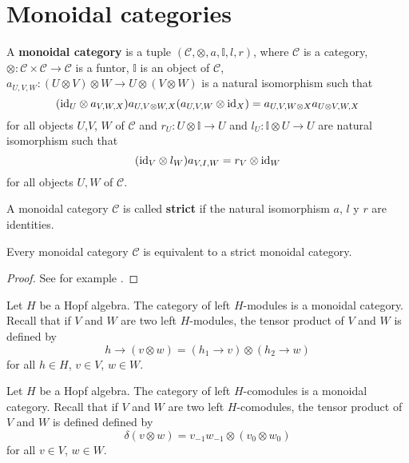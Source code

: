 \section{Monoidal categories}

\begin{definition}
A \textbf{monoidal category} is a tuple
$(\mathcal{C},\otimes,a,\mathbb{I},l,r)$, where $\mathcal{C}$ is a category,
$\otimes:\mathcal{C}\times\mathcal{C}\to\mathcal{C}$ is a funtor, $\mathbb{I}$
is an object of $\mathcal{C}$, $a_{U,V,W}:(U\otimes V)\otimes W\to
U\otimes(V\otimes W)$ is a natural isomorphism such that 
\begin{equation}
(\id_{U}\otimes a_{V,W,X})a_{U,V\otimes W,X}(a_{U,V,W}\otimes\id_{X})=a_{U,V,W\otimes X}a_{U\otimes V,W,X}\label{eq:pentagon}
\end{equation}
for all objects $U$,$V$, $W$ of $\mathcal{C}$ and $r_{U}:U\otimes\mathbb{I}\to U$
and $l_{U}:\mathbb{I}\otimes U\to U$ are natural isomorphism such
that 
\begin{equation}
(\id_{V}\otimes l_{W})a_{V,I,W}=r_{V}\otimes\id_{W}\label{eq:triangles}
\end{equation}
for all objects $U,W$ of $\mathcal{C}$.
\end{definition}

\begin{definition}
A monoidal category $\mathcal{C}$ is called \textbf{strict} if the natural
isomorphism $a$, $l$ y $r$ are identities. 
\end{definition}

\begin{theorem}
Every monoidal category $\mathcal{C}$ is equivalent to a strict monoidal
category.
\end{theorem}

\begin{proof}
See for example \cite[Theorem XI.5.3]{MR1321145}.
\end{proof}

\begin{example}
Let $H$ be a Hopf algebra. The category of left $H$-modules is a monoidal
category.  Recall that if $V$ and $W$ are two left $H$-modules, the tensor
product of $V$ and $W$ is defined by 
\[
h\rightarrow(v\otimes w)=(h_{1}\rightarrow v)\otimes(h_{2}\rightarrow w)
\]
for all $h\in H$, $v\in V$, $w\in W$. 
\end{example}

\begin{example}
Let $H$ be a Hopf algebra. The category of left $H$-comodules is a monoidal
category.  Recall that if $V$ and $W$ are two left $H$-comodules, the tensor
product of $V$ and $W$ is defined defined by 
\[
\delta(v\otimes w)=v_{-1}w_{-1}\otimes(v_0\otimes w_0)
\]
for all $v\in V$, $w\in W$.
\end{example}

